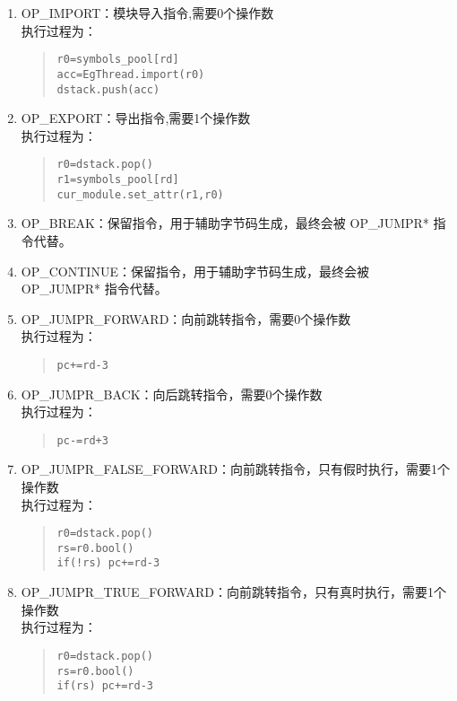\begin{enumerate}
\item OP\_IMPORT：模块导入指令,需要0个操作数 \\
执行过程为：
\begin{quote}
\begin{verbatim}
r0=symbols_pool[rd]
acc=EgThread.import(r0)
dstack.push(acc)
\end{verbatim}
\end{quote}

\item OP\_EXPORT：导出指令,需要1个操作数 \\
执行过程为：
\begin{quote}
\begin{verbatim}
r0=dstack.pop()
r1=symbols_pool[rd]
cur_module.set_attr(r1,r0)
\end{verbatim}
\end{quote}

\item OP\_BREAK：保留指令，用于辅助字节码生成，最终会被 OP\_JUMPR* 指令代替。
\item OP\_CONTINUE：保留指令，用于辅助字节码生成，最终会被 OP\_JUMPR* 指令代替。

\item OP\_JUMPR\_FORWARD：向前跳转指令，需要0个操作数 \\
执行过程为：
\begin{quote}
\begin{verbatim}
pc+=rd-3
\end{verbatim}
\end{quote}

\item OP\_JUMPR\_BACK：向后跳转指令，需要0个操作数 \\
执行过程为：
\begin{quote}
\begin{verbatim}
pc-=rd+3
\end{verbatim}
\end{quote}

\item OP\_JUMPR\_FALSE\_FORWARD：向前跳转指令，只有假时执行，需要1个操作数 \\
执行过程为：
\begin{quote}
\begin{verbatim}
r0=dstack.pop()
rs=r0.bool()
if(!rs) pc+=rd-3
\end{verbatim}
\end{quote}

\item OP\_JUMPR\_TRUE\_FORWARD：向前跳转指令，只有真时执行，需要1个操作数 \\
执行过程为：
\begin{quote}
\begin{verbatim}
r0=dstack.pop()
rs=r0.bool()
if(rs) pc+=rd-3
\end{verbatim}
\end{quote}


\end{enumerate}

